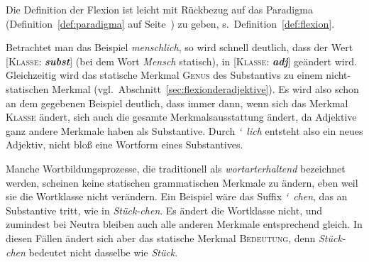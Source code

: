 
Die Definition der Flexion ist leicht mit Rückbezug auf das Paradigma (Definition~\ref{def:paradigma} auf Seite~\pageref{def:paradigma}) zu geben, s.\ Definition~\ref{def:flexion}.


Betrachtet man das Beispiel \textit{menschlich}, so wird schnell deutlich, dass der Wert [\textsc{Klasse}: \textit{\textbf{subst}}] (bei dem Wort \textit{Mensch} statisch), in [\textsc{Klasse}: \textit{\textbf{adj}}] geändert wird.
Gleichzeitig wird das statische Merkmal \textsc{Genus} des Substantivs zu einem nicht-statischen Merkmal (vgl.\ Abschnitt~\ref{sec:flexionderadjektive}).
Es wird also schon an dem gegebenen Beispiel deutlich, dass immer dann, wenn sich das Merkmal \textsc{Klasse} ändert, sich auch die gesamte Merkmalsausstattung ändert, da Adjektive \zB ganz andere Merkmale haben als Substantive.
Durch \mbox{\textit{\char`~lich}} entsteht also ein neues Adjektiv, nicht bloß eine Wortform eines Substantives.

Manche Wortbildungsprozesse, die traditionell als \textit{wortarterhaltend} bezeichnet werden, scheinen keine statischen grammatischen Merkmale zu ändern, eben weil sie die Wortklasse nicht verändern.
Ein Beispiel wäre das Suffix \mbox{\textit{\char`~chen}}, das an Substantive tritt, wie in \textit{Stück-chen}.
Es ändert die Wortklasse nicht, und zumindest bei Neutra bleiben auch alle anderen Merkmale entsprechend gleich.
In diesen Fällen ändert sich aber das statische Merkmal \textsc{Bedeutung}, denn \textit{Stück-chen} bedeutet nicht dasselbe wie \textit{Stück}.

